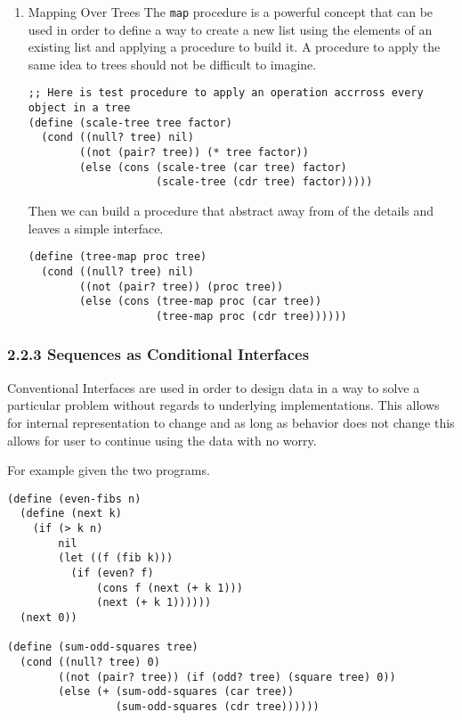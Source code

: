 \documentclass[11pt]{article}
\begin{document}
\begin{enumerate}
\item Mapping Over Trees
\label{sec:orgb29765a}
The \texttt{map} procedure is a powerful concept that can be used in order to
define a way to create a new list using the elements of an existing list
and applying a procedure to build it. A procedure to apply the same idea
to trees should not be difficult to imagine.

\begin{verbatim}
;; Here is test procedure to apply an operation accrross every object in a tree
(define (scale-tree tree factor)
  (cond ((null? tree) nil)
        ((not (pair? tree)) (* tree factor))
        (else (cons (scale-tree (car tree) factor)
                    (scale-tree (cdr tree) factor)))))
\end{verbatim}

Then we can build a procedure that abstract away from of the details and
leaves a simple interface.

\begin{verbatim}
(define (tree-map proc tree)
  (cond ((null? tree) nil)
        ((not (pair? tree)) (proc tree))
        (else (cons (tree-map proc (car tree))
                    (tree-map proc (cdr tree))))))
\end{verbatim}
\end{enumerate}

\subsubsection{2.2.3 Sequences as Conditional Interfaces}
\label{sec:org5ddfc65}
Conventional Interfaces are used in order to design data in a way to
solve a particular problem without regards to underlying
implementations. This allows for internal representation to change and
as long as behavior does not change this allows for user to continue
using the data with no worry.

For example given the two programs.

\begin{verbatim}
(define (even-fibs n)
  (define (next k)
    (if (> k n)
        nil
        (let ((f (fib k)))
          (if (even? f)
              (cons f (next (+ k 1)))
              (next (+ k 1))))))
  (next 0))

(define (sum-odd-squares tree)
  (cond ((null? tree) 0)
        ((not (pair? tree)) (if (odd? tree) (square tree) 0))
        (else (+ (sum-odd-squares (car tree))
                 (sum-odd-squares (cdr tree))))))
\end{verbatim}
\end{document}
